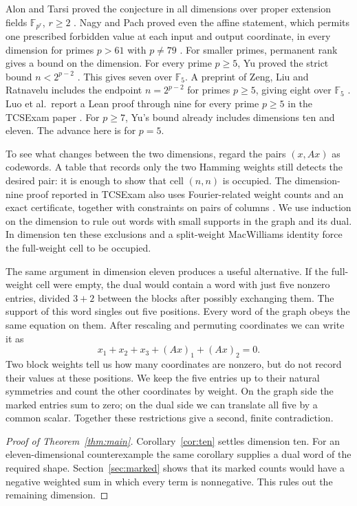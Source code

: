 \documentclass[11pt]{article}
\theoremstyle{definition}\newtheorem{definition}[theorem]{Definition}
\theoremstyle{remark}\newtheorem{remark}[theorem]{Remark}
\newcommand{\F}{\mathbb F_5}
\begin{document}
Alon and Tarsi proved the conjecture in all dimensions over proper extension fields $\mathbb F_{p^r}$, $r\ge2$ \cite[Theorem~1]{alontarsi}. Nagy and Pach proved even the affine statement, which permits one prescribed forbidden value at each input and output coordinate, in every dimension for primes $p>61$ with $p\ne79$ \cite[Theorem~A in the arXiv version]{nagypach}. For smaller primes, permanent rank gives a bound on the dimension. For every prime $p\ge5$, Yu proved the strict bound $n<2^{p-2}$ \cite{yu}. This gives seven over $\F$. A preprint of Zeng, Liu and Ratnavelu includes the endpoint $n=2^{p-2}$ for primes $p\ge5$, giving eight over $\F$ \cite[Theorem~1.1 and Corollary~1.2]{zeng}. Luo et al.\ report a Lean proof through nine for every prime $p\ge5$ in the TCSExam paper \cite[Appendix~F.3, Eq.~(9)]{tcsexam}. For $p\ge7$, Yu's bound already includes dimensions ten and eleven. The advance here is for $p=5$.

To see what changes between the two dimensions, regard the pairs $(x,Ax)$ as codewords. A table that records only the two Hamming weights still detects the desired pair: it is enough to show that cell $(n,n)$ is occupied. The dimension-nine proof reported in TCSExam also uses Fourier-related weight counts and an exact certificate, together with constraints on pairs of columns \cite[Appendix~F.3]{tcsexam}. We use induction on the dimension to rule out words with small supports in the graph and its dual. In dimension ten these exclusions and a split-weight MacWilliams identity force the full-weight cell to be occupied.

The same argument in dimension eleven produces a useful alternative. If the full-weight cell were empty, the dual would contain a word with just five nonzero entries, divided $3+2$ between the blocks after possibly exchanging them. The support of this word singles out five positions. Every word of the graph obeys the same equation on them. After rescaling and permuting coordinates we can write it as
\[
       x_1+x_2+x_3+(Ax)_1+(Ax)_2=0.
\]
Two block weights tell us how many coordinates are nonzero, but do not record their values at these positions. We keep the five entries up to their natural symmetries and count the other coordinates by weight. On the graph side the marked entries sum to zero; on the dual side we can translate all five by a common scalar. Together these restrictions give a second, finite contradiction.




\begin{proof}[Proof of Theorem~\ref{thm:main}]
Corollary~\ref{cor:ten} settles dimension ten. For an eleven-dimensional counterexample the same corollary supplies a dual word of the required shape. Section~\ref{sec:marked} shows that its marked counts would have a negative weighted sum in which every term is nonnegative. This rules out the remaining dimension.
\end{proof}
\end{document}
